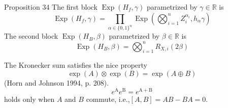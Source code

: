 \begin{proposition}
    Proposition 34 The first block $\operatorname{Exp}\left(H_{f}, \gamma\right)$ parametrized by $\gamma \in \mathbb{R}$ is
$$
\operatorname{Exp}\left(H_{f}, \gamma\right)=\prod_{\alpha \in\{0,1\}^{n}} \operatorname{Exp}\left(\bigotimes_{i=1}^{n} Z_{i}^{\alpha_{i}}, h_{\alpha} \gamma\right)
$$
The second block $\operatorname{Exp}\left(H_{B}, \beta\right)$ parametrized by $\beta \in \mathbb{R}$ is
$$
\operatorname{Exp}\left(H_{B}, \beta\right)=\bigotimes_{i=1}^{n} R_{X, i}(2 \beta)
$$
\end{proposition}

\begin{remark}
    The Kronecker sum satisfies the nice property
$$
\exp (A) \otimes \exp (B)=\exp (A \oplus B)
$$
(Horn and Johnson 1994, p. 208).
$$
e^{\mathrm{A}} e^{\mathrm{B}}=e^{\mathrm{A}+\mathrm{B}}
$$
holds only when $A$ and $B$ commute, i.e.,$[A, B]=A B-B A=0.$
\end{remark}

